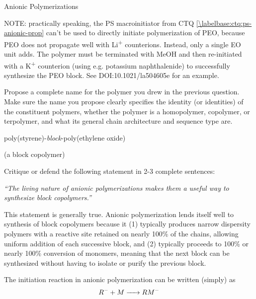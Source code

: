 \begin{activity}{Anionic Polymerizations}
\begin{ctqs}
\begin{solution}[1.75in]{}
			NOTE: practically speaking, the PS macroinitiator from CTQ \ref{\labelbase:ctq:ps-anionic-prop} can't be used to directly initiate polymerization of PEO, because PEO does not propagate well with Li\textsuperscript{+} counterions.  Instead, only a single EO unit adds. The polymer must be terminated with MeOH and then re-initiated with a K\textsuperscript{+} counterion (using e.g. potassium naphthalenide) to successfully synthesize the PEO block.  See DOI:10.1021/la504605e for an example.
		
		\end{solution}
	
	\question Propose a complete name for the polymer you drew in the previous question.  Make sure the name you propose clearly specifies the identity (or identities) of the constituent polymers, whether the polymer is a homopolymer, copolymer, or terpolymer, and what its general chain architecture and sequence type are. 
	
		\begin{solution}[1.25in]{}
			poly(styrene)-\emph{block}-poly(ethylene oxide)
			
			(a block copolymer)
		\end{solution}
		
	\question Critique or defend the following statement in 2-3 complete sentences:
	
		\emph{``The living nature of anionic polymerizations makes them a useful way to synthesize block copolymers.''}
		
		\begin{solution}[1.5in]{}
			This statement is generally true.  Anionic polymerization lends itself well to synthesis of block copolymers because it (1) typically produces narrow dispersity polymers with a reactive site retained on nearly 100\% of the chains, allowing uniform addition of each successive block, and (2) typically proceeds to 100\% or nearly 100\% conversion of monomers, meaning that the next block can be synthesized without having to isolate or purify the previous block.
		\end{solution}
	
\end{ctqs}


\begin{exercises}


	\exercise The initiation reaction in anionic polymerization can be written (simply) as %
		\begin{equation*}
			R^- + M \ce{->} RM^-
		\end{equation*}
		

\end{exercises}
\end{activity}
